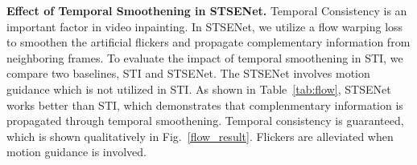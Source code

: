 \noindent \textbf{Effect of Temporal Smoothening in STSENet.}
Temporal Consistency is an important factor in video inpainting. In STSENet, we utilize a flow warping loss to smoothen the artificial flickers and propagate complementary information from neighboring frames. To evaluate the impact of temporal smoothening in STI, we compare two baselines, STI and STSENet. The STSENet involves motion guidance which is not utilized in STI.
As shown in Table~\ref{tab:flow}, STSENet works better than STI, which demonstrates that complenmentary information is propagated through temporal smoothening. Temporal consistency is guaranteed, which is shown qualitatively in Fig.~\ref{flow_result}. Flickers are alleviated when motion guidance is involved. 

\begin{table}[t]
	\caption{The effect of temporal smoothening in STSENet. The mask number denotes the indexes of mask setting in the section Experimental Settings. We compare STSENet and STI in three aspects of metrics.}\smallskip
	\centering
	\label{tab:flow}
\end{table}

